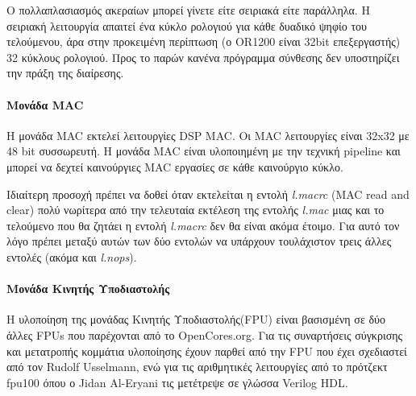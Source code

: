 \documentclass[a4paper,10pt]{article}
\numberwithin{figure}{section}
\numberwithin{table}{section}
\begin{document}
Ο πολλαπλασιασμός ακεραίων μπορεί γίνετε είτε σειριακά είτε παράλληλα. Η σειριακή λειτουργία
απαιτεί ένα κύκλο ρολογιού για κάθε δυαδικό ψηφίο του τελούμενου, άρα στην προκειμένη περίπτωση
(ο OR1200 είναι 32bit επεξεργαστής) 32 κύκλους ρολογιού. Προς το παρών κανένα πρόγραμμα σύνθεσης
δεν υποστηρίζει την πράξη της διαίρεσης. 

\paragraph{Μονάδα MAC\newline\newline}

Η μονάδα MAC εκτελεί λειτουργίες DSP MAC. Οι MAC λειτουργίες είναι 32x32 με 48 bit συσσωρευτή. 
Η μονάδα MAC είναι υλοποιημένη με την 
τεχνική pipeline και μπορεί να δεχτεί καινούργιες MAC εργασίες σε κάθε καινούργιο κύκλο.

Ιδιαίτερη προσοχή πρέπει να δοθεί όταν εκτελείται η εντολή \emph{l.macrc} (MAC read and clear) πολύ νωρίτερα από την τελευταία εκτέλεση της εντολής \emph{l.mac} μιας και το τελούμενο που θα ζητάει η εντολή \emph{l.macrc} δεν θα είναι ακόμα έτοιμο. Για αυτό τον λόγο πρέπει μεταξύ αυτών των δύο εντολών να υπάρχουν τουλάχιστον τρεις άλλες εντολές (ακόμα και \emph{l.nops}).

\paragraph{Μονάδα Κινητής Υποδιαστολής\newline\newline}

Η υλοποίηση της μονάδας Κινητής Υποδιαστολής(FPU) είναι βασισμένη σε δύο άλλες FPUs που 
παρέχονται από το OpenCores.org. Για τις συναρτήσεις σύγκρισης και μετατροπής κομμάτια υλοποίησης
έχουν παρθεί από την FPU που έχει σχεδιαστεί από τον Rudolf Usselmann, ενώ για τις αριθμητικές
λειτουργίες από το πρότζεκτ fpu100 όπου ο Jidan Al-Eryani τις μετέτρεψε σε γλώσσα Verilog HDL.
\newline
\end{document}
